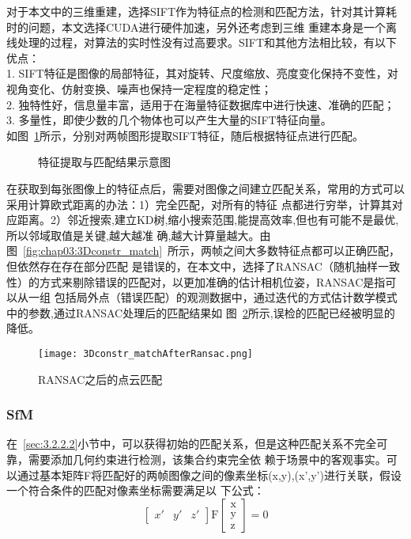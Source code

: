 对于本文中的三维重建，选择SIFT作为特征点的检测和匹配方法，针对其计算耗时的问题，本文选择CUDA进行硬件加速，另外还考虑到三维
重建本身是一个离线处理的过程，对算法的实时性没有过高要求。SIFT和其他方法相比较，有以下优点：\\
1. SIFT特征是图像的局部特征，其对旋转、尺度缩放、亮度变化保持不变性，对视角变化、仿射变换、噪声也保持一定程度的稳定性；\\
2. 独特性好，信息量丰富，适用于在海量特征数据库中进行快速、准确的匹配；\\
3. 多量性，即使少数的几个物体也可以产生大量的SIFT特征向量。\\
如图~\ref{fig:3Dconstrmatchresult}所示，分别对两帧图形提取SIFT特征，随后根据特征点进行匹配。
\begin{figure}[H]
    \centering
    \vskip0.5cm
    \caption{特征提取与匹配结果示意图}\label{fig:3Dconstrmatchresult}
  \end{figure}
在获取到每张图像上的特征点后，需要对图像之间建立匹配关系，常用的方式可以采用计算欧式距离的办法：1）完全匹配，对所有的特征
点都进行穷举，计算其对应距离。2）邻近搜索,建立KD树,缩小搜索范围,能提高效率,但也有可能不是最优,所以邻域取值是关键,越大越准
确,越大计算量越大。由图~\ref{fig:chap03:3Dconstr_match}~所示，两帧之间大多数特征点都可以正确匹配，但依然存在存在部分匹配
是错误的，在本文中，选择了RANSAC（随机抽样一致性）的方式来剔除错误的匹配对，以更加准确的估计相机位姿，RANSAC是指可以从一组
包括局外点（错误匹配）的观测数据中，通过迭代的方式估计数学模式中的参数,通过RANSAC处理后的匹配结果如
图~\ref{fig:3Dconstr_matchAfterRansac}所示,误检的匹配已经被明显的降低。
\begin{figure}[H] %
  \centering
  \texttt{[image: 3Dconstr\_matchAfterRansac.png]}
  \caption{RANSAC之后的点云匹配}
  \label{fig:3Dconstr_matchAfterRansac}
  \end{figure}
\subsubsection{SfM} 
\label{sec:3.2.2.3}
在~\ref{sec:3.2.2.2}小节中，可以获得初始的匹配关系，但是这种匹配关系不完全可靠，需要添加几何约束进行检测，该集合约束完全依
赖于场景中的客观事实。可以通过基本矩阵F将匹配好的两帧图像之间的像素坐标(x,y),(x',y')进行关联，假设一个符合条件的匹配对像素坐标需要满足以
下公式：
\begin{equation}
\begin{bmatrix}x'&y'&z'\end{bmatrix}\mathrm F\begin{bmatrix}\mathrm x\\\mathrm y\\\mathrm z\end{bmatrix}=0
\end{equation}

